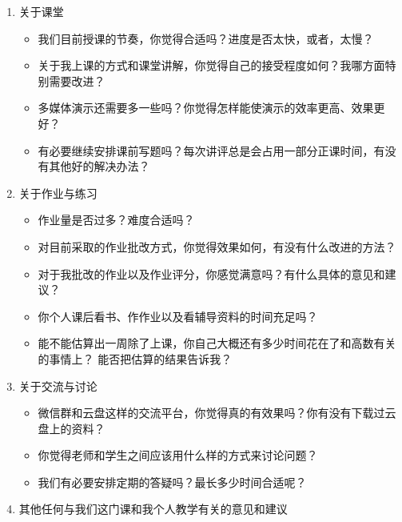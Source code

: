 \begin{enumerate}
  \item 关于课堂
  \begin{itemize}
    \item 我们目前授课的节奏，你觉得合适吗？进度是否太快，或者，太慢？
    \item 关于我上课的方式和课堂讲解，你觉得自己的接受程度如何？我哪方面特别需要改进？
    \item 多媒体演示还需要多一些吗？你觉得怎样能使演示的效率更高、效果更好？ 
    \item 有必要继续安排课前写题吗？每次讲评总是会占用一部分正课时间，有没有其他好的解决办法？
  \end{itemize}
  \item 关于作业与练习
  \begin{itemize}
    \item 作业量是否过多？难度合适吗？
    \item 对目前采取的作业批改方式，你觉得效果如何，有没有什么改进的方法？
    \item 对于我批改的作业以及作业评分，你感觉满意吗？有什么具体的意见和建议？
    \item 你个人课后看书、作作业以及看辅导资料的时间充足吗？
    \item 能不能估算出一周除了上课，你自己大概还有多少时间花在了和高数有关的事情上？
    能否把估算的结果告诉我？
  \end{itemize}
  \item 关于交流与讨论
  \begin{itemize}
    \item 微信群和云盘这样的交流平台，你觉得真的有效果吗？你有没有下载过云盘上的资料？
    \item 你觉得老师和学生之间应该用什么样的方式来讨论问题？
    \item 我们有必要安排定期的答疑吗？最长多少时间合适呢？
  \end{itemize}
  \item 其他任何与我们这门课和我个人教学有关的意见和建议
\end{enumerate}

\fi

% 
% 



